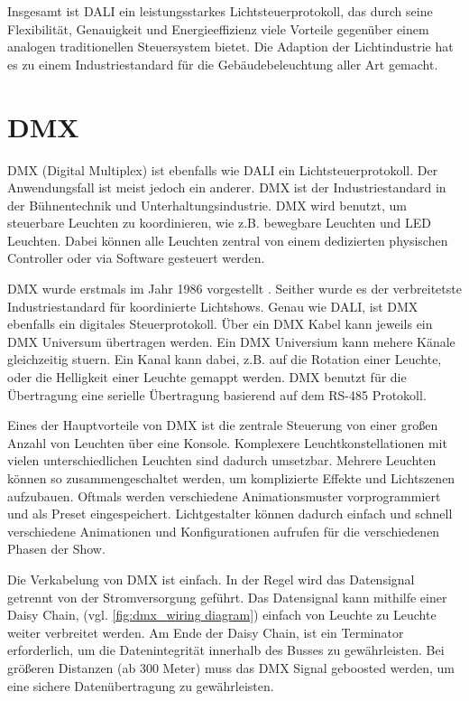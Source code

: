 Insgesamt ist DALI ein leistungsstarkes Lichtsteuerprotokoll, das durch seine Flexibilität, Genauigkeit und Energieeffizienz viele Vorteile gegenüber einem analogen traditionellen Steuersystem bietet. Die Adaption der Lichtindustrie hat es zu einem Industriestandard für die Gebäudebeleuchtung aller Art gemacht.

\section{DMX}

DMX (Digital Multiplex) ist ebenfalls wie DALI ein Lichtsteuerprotokoll. Der Anwendungsfall ist meist jedoch ein anderer. DMX ist der Industriestandard in der Bühnentechnik und Unterhaltungsindustrie. DMX wird benutzt, um steuerbare Leuchten zu koordinieren, wie z.B. bewegbare Leuchten und LED Leuchten. Dabei können alle Leuchten zentral von einem dedizierten physischen Controller oder via Software gesteuert werden.

DMX wurde erstmals im Jahr 1986 vorgestellt \cite[p.5, ch. 2.1]{DMX101-Handbook}. Seither wurde es der verbreitetste Industriestandard für koordinierte Lichtshows. Genau wie DALI, ist DMX ebenfalls ein digitales Steuerprotokoll. Über ein DMX Kabel kann jeweils ein DMX Universum übertragen werden. Ein DMX Universium kann mehere Känale gleichzeitig stuern. Ein Kanal kann dabei, z.B. auf die Rotation einer Leuchte, oder die Helligkeit einer Leuchte gemappt werden. DMX benutzt für die Übertragung eine serielle Übertragung basierend auf dem RS-485 Protokoll\cite[p.11, ch. 3.2]{DMX101-Handbook}.

Eines der Hauptvorteile von DMX ist die zentrale Steuerung von einer großen Anzahl von Leuchten über eine Konsole. Komplexere Leuchtkonstellationen mit vielen unterschiedlichen Leuchten sind dadurch umsetzbar. Mehrere Leuchten können so zusammengeschaltet werden, um komplizierte Effekte und Lichtszenen aufzubauen. Oftmals werden verschiedene Animationsmuster vorprogrammiert und als Preset eingespeichert. Lichtgestalter können dadurch einfach und schnell verschiedene Animationen und Konfigurationen aufrufen für die verschiedenen Phasen der Show.

Die Verkabelung von DMX ist einfach. In der Regel wird das Datensignal getrennt von der Stromversorgung geführt. Das Datensignal kann mithilfe einer Daisy Chain, (vgl. \ref{fig:dmx_wiring diagram}) einfach von Leuchte zu Leuchte weiter verbreitet werden. Am Ende der Daisy Chain, ist ein Terminator erforderlich, um die Datenintegrität innerhalb des Busses zu gewährleisten. Bei größeren Distanzen (ab 300 Meter) muss das DMX Signal geboosted werden, um eine sichere Datenübertragung zu gewährleisten.

